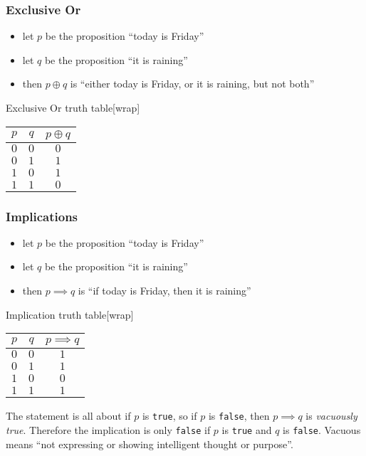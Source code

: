 \subsubsection{Exclusive Or}\label{ssub:exclusive_or}

\begin{itemize}[label={}]
    \item let \(p\) be the proposition ``today is Friday''
    \item let \(q\) be the proposition ``it is raining''
    \item then \(p \oplus q\) is ``either today is Friday, or it is raining, but not both''
\end{itemize}

\begin{highlight}{Exclusive Or truth table}[wrap]
    \begin{tabular}{ccc}
        \toprule
        \(p\) & \(q\) & \(p \oplus q\) \\
        \midrule
        \(0\) & \(0\) & \(0\)          \\
        \(0\) & \(1\) & \(1\)          \\
        \(1\) & \(0\) & \(1\)          \\
        \(1\) & \(1\) & \(0\)          \\
        \bottomrule
    \end{tabular}
\end{highlight}

\subsubsection{Implications}\label{ssub:implications_connectives}

\begin{itemize}[label={}]
    \item let \(p\) be the proposition ``today is Friday''
    \item let \(q\) be the proposition ``it is raining''
    \item then \(p \implies q\) is ``if today is Friday, then it is raining''
\end{itemize}

\begin{highlight}{Implication truth table}[wrap]
    \begin{tabular}{ccc}
        \toprule
        \(p\) & \(q\) & \(p \implies q\) \\
        \midrule
        \(0\) & \(0\) & \(1\)            \\
        \(0\) & \(1\) & \(1\)            \\
        \(1\) & \(0\) & \(0\)            \\
        \(1\) & \(1\) & \(1\)            \\
        \bottomrule
    \end{tabular}
\end{highlight}
The statement is all about if \(p\) is \texttt{true}, so if \(p\) is \texttt{false}, then \(p \implies q\) is \emph{vacuously true}.
Therefore the implication is only \texttt{false} if \(p\) is \texttt{true} and \(q\) is \texttt{false}.
Vacuous means ``not expressing or showing intelligent thought or purpose''.

